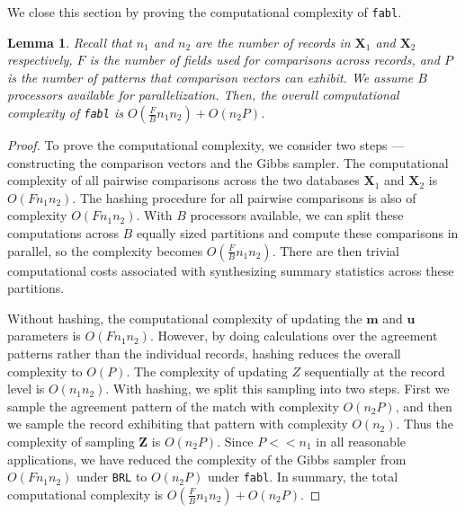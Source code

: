 \documentclass[ba]{imsart}
\newtheorem{lemma}{Lemma}
\begin{document}
	We close this section by proving the computational complexity of \texttt{fabl}.
	
	\begin{lemma}
		Recall that $n_1$ and $n_2$ are the number of records in $\bm{X}_1$ and $\bm{X}_2$ respectively, $F$ is the number of fields used for comparisons across records, and $P$ is the number of patterns that comparison vectors can exhibit. We assume $B$ processors available for parallelization. Then, the overall computational complexity of \texttt{fabl} is $O(\frac{F}{B} n_1 n_2) + O(n_2 P)$.
		\label{lemma:fabl}
	\end{lemma}
	
	\begin{proof}
		To prove the computational complexity, we consider two steps --- constructing the comparison vectors and the Gibbs sampler. 
		The computational complexity of all pairwise comparisons across the two databases $\bm{X}_1$ and $\bm{X}_2$ is $O(F n_1 n_2)$. The hashing procedure for all pairwise comparisons is also of complexity $O(F n_1 n_2)$. With $B$ processors available, we can split these computations across $B$ equally sized partitions and compute these comparisons in parallel, so the complexity becomes $O(\frac{F}{B} n_1 n_2)$. There are then trivial computational costs associated with synthesizing summary statistics across these partitions. 
		
		Without hashing, the computational complexity of updating the $\bm{m}$ and $\bm{u}$ parameters is $O(F n_1 n_2)$. However, by doing calculations over the agreement patterns rather than the individual records, hashing reduces the overall complexity to $O(P)$. The complexity of updating $Z$ sequentially at the record level is $O(n_1 n_2)$. With hashing, we split this sampling into two steps. First we sample the agreement pattern of the match with complexity $O(n_2 P)$, and then we sample the record exhibiting that pattern with complexity $O(n_2)$. Thus the complexity of sampling $\bm{Z}$ is $O(n_2 P)$. Since $P << n_1$ in all reasonable applications, we have reduced the complexity of the Gibbs sampler from $O(F n_1 n_2)$ under \texttt{BRL} to $O(n_2 P)$ under \texttt{fabl}.
		In summary, the total computational complexity is $O(\frac{F}{B} n_1 n_2) + O(n_2 P).$
	\end{proof} 
	
\end{document}
